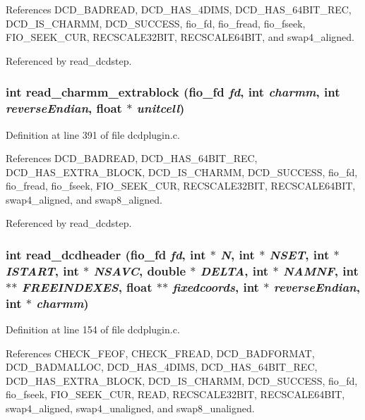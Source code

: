 References DCD\_\-BADREAD, DCD\_\-HAS\_\-4DIMS, DCD\_\-HAS\_\-64BIT\_\-REC, DCD\_\-IS\_\-CHARMM, DCD\_\-SUCCESS, fio\_\-fd, fio\_\-fread, fio\_\-fseek, FIO\_\-SEEK\_\-CUR, RECSCALE32BIT, RECSCALE64BIT, and swap4\_\-aligned.

Referenced by read\_\-dcdstep.
\subsubsection{\setlength{\rightskip}{0pt plus 5cm}int read\_\-charmm\_\-extrablock ({\bf fio\_\-fd} {\em fd}, int {\em charmm}, int {\em reverse\-Endian}, float $\ast$ {\em unitcell})\hspace{0.3cm}{\tt  [static]}}\label{dcdplugin_8c_a27}




Definition at line 391 of file dcdplugin.c.

References DCD\_\-BADREAD, DCD\_\-HAS\_\-64BIT\_\-REC, DCD\_\-HAS\_\-EXTRA\_\-BLOCK, DCD\_\-IS\_\-CHARMM, DCD\_\-SUCCESS, fio\_\-fd, fio\_\-fread, fio\_\-fseek, FIO\_\-SEEK\_\-CUR, RECSCALE32BIT, RECSCALE64BIT, swap4\_\-aligned, and swap8\_\-aligned.

Referenced by read\_\-dcdstep.
\subsubsection{\setlength{\rightskip}{0pt plus 5cm}int read\_\-dcdheader ({\bf fio\_\-fd} {\em fd}, int $\ast$ {\em N}, int $\ast$ {\em NSET}, int $\ast$ {\em ISTART}, int $\ast$ {\em NSAVC}, double $\ast$ {\em DELTA}, int $\ast$ {\em NAMNF}, int $\ast$$\ast$ {\em FREEINDEXES}, float $\ast$$\ast$ {\em fixedcoords}, int $\ast$ {\em reverse\-Endian}, int $\ast$ {\em charmm})\hspace{0.3cm}{\tt  [static]}}\label{dcdplugin_8c_a26}




Definition at line 154 of file dcdplugin.c.

References CHECK\_\-FEOF, CHECK\_\-FREAD, DCD\_\-BADFORMAT, DCD\_\-BADMALLOC, DCD\_\-HAS\_\-4DIMS, DCD\_\-HAS\_\-64BIT\_\-REC, DCD\_\-HAS\_\-EXTRA\_\-BLOCK, DCD\_\-IS\_\-CHARMM, DCD\_\-SUCCESS, fio\_\-fd, fio\_\-fseek, FIO\_\-SEEK\_\-CUR, READ, RECSCALE32BIT, RECSCALE64BIT, swap4\_\-aligned, swap4\_\-unaligned, and swap8\_\-unaligned.

